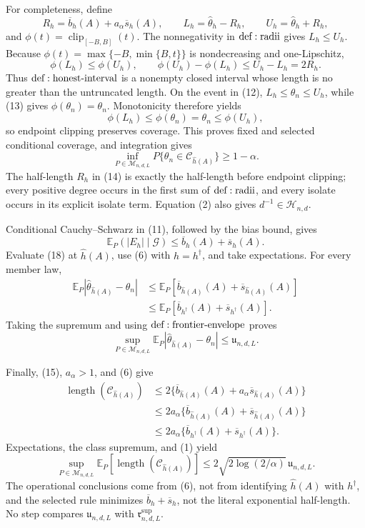 For completeness, define
\[
 R_h=\overline b_h(A)+a_\alpha\overline s_h(A),
 \qquad L_h=\widehat\theta_h-R_h,
 \qquad U_h=\widehat\theta_h+R_h,
\tag{14}
\]
and \(\phi(t)=\operatorname{clip}_{[-B,B]}(t)\).  The nonnegativity in \({\rm def:radii}\) gives \(L_h\leq U_h\).  Because \(\phi(t)=\max\{-B,\min\{B,t\}\}\) is nondecreasing and one-Lipschitz,
\[
 \phi(L_h)\leq\phi(U_h),
 \qquad
 \phi(U_h)-\phi(L_h)\leq U_h-L_h=2R_h.
\tag{15}
\]
Thus \({\rm def:honest\text{-}interval}\) is a nonempty closed interval whose length is no greater than the untruncated length.  On the event in (12), \(L_h\leq\theta_n\leq U_h\), while (13) gives \(\phi(\theta_n)=\theta_n\).  Monotonicity therefore yields
\[
 \phi(L_h)\leq\phi(\theta_n)=\theta_n\leq\phi(U_h),
\tag{16}
\]
so endpoint clipping preserves coverage.  This proves fixed and selected conditional coverage, and integration gives
\[
 \inf_{P\in\mathcal M_{n,d,L}}
 P\{\theta_n\in\mathcal C_{\widehat h(A)}\}\geq1-\alpha.
\tag{17}
\]
The half-length \(R_h\) in (14) is exactly the half-length before endpoint clipping; every positive degree occurs in the first sum of \({\rm def:radii}\), and every isolate occurs in its explicit isolate term.  Equation (2) also gives \(d^{-1}\in\mathcal H_{n,d}\).

Conditional Cauchy--Schwarz in (11), followed by the bias bound, gives
\[
 \mathbb E_P(|E_h|\mid\mathcal G)
 \leq\overline b_h(A)+\overline s_h(A).
\tag{18}
\]
Evaluate (18) at \(\widehat h(A)\), use (6) with \(h=h^\dagger\), and take expectations.  For every member law,
\[
\begin{aligned}
 \mathbb E_P|\widehat\theta_{\widehat h(A)}-\theta_n|
 &\leq\mathbb E_P[\overline b_{\widehat h(A)}(A)+\overline s_{\widehat h(A)}(A)]\\
 &\leq\mathbb E_P[\overline b_{h^\dagger}(A)+\overline s_{h^\dagger}(A)].
\end{aligned}
\tag{19}
\]
Taking the supremum and using \({\rm def:frontier\text{-}envelope}\) proves
\[
 \sup_{P\in\mathcal M_{n,d,L}}
 \mathbb E_P|\widehat\theta_{\widehat h(A)}-\theta_n|
 \leq\mathfrak u_{n,d,L}.
\tag{20}
\]

Finally, (15), \(a_\alpha>1\), and (6) give
\[
\begin{aligned}
 \operatorname{length}(\mathcal C_{\widehat h(A)})
 &\leq2\{\overline b_{\widehat h(A)}(A)
          +a_\alpha\overline s_{\widehat h(A)}(A)\}\\
 &\leq2a_\alpha\{\overline b_{\widehat h(A)}(A)
          +\overline s_{\widehat h(A)}(A)\}\\
 &\leq2a_\alpha\{\overline b_{h^\dagger}(A)
          +\overline s_{h^\dagger}(A)\}.
\end{aligned}
\tag{21}
\]
Expectations, the class supremum, and (1) yield
\[
 \sup_{P\in\mathcal M_{n,d,L}}
 \mathbb E_P[\operatorname{length}(\mathcal C_{\widehat h(A)})]
 \leq2\sqrt{2\log(2/\alpha)}\,\mathfrak u_{n,d,L}.
\tag{22}
\]
The operational conclusions come from (6), not from identifying \(\widehat h(A)\) with \(h^\dagger\), and the selected rule minimizes \(\overline b_h+\overline s_h\), not the literal exponential half-length.  No step compares \(\mathfrak u_{n,d,L}\) with \(\mathfrak r^{\mathrm{sup}}_{n,d,L}\).